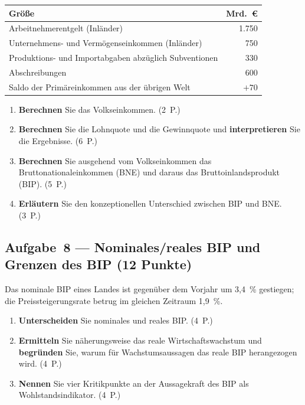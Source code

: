 \documentclass[11pt, a4paper]{article}
\begin{document}
\begin{center}
\begin{tabular}{l r}
\toprule
\textbf{Größe} & \textbf{Mrd.~€}\\
\midrule
Arbeitnehmerentgelt (Inländer) & 1.750\\
Unternehmens- und Vermögenseinkommen (Inländer) & 750\\
Produktions- und Importabgaben abzüglich Subventionen & 330\\
Abschreibungen & 600\\
Saldo der Primäreinkommen aus der übrigen Welt & $+70$\\
\bottomrule
\end{tabular}
\end{center}

\begin{enumerate}[label=(\alph*)]
  \item \textbf{Berechnen} Sie das Volkseinkommen. \hfill (2~P.)
  \item \textbf{Berechnen} Sie die Lohnquote und die Gewinnquote und \textbf{interpretieren} Sie die Ergebnisse. \hfill (6~P.)
  \item \textbf{Berechnen} Sie ausgehend vom Volkseinkommen das Bruttonationaleinkommen (BNE) und daraus das Bruttoinlandsprodukt (BIP). \hfill (5~P.)
  \item \textbf{Erläutern} Sie den konzeptionellen Unterschied zwischen BIP und BNE. \hfill (3~P.)
\end{enumerate}

\subsection*{Aufgabe~8 --- Nominales/reales BIP und Grenzen des BIP (12 Punkte)}

Das nominale BIP eines Landes ist gegenüber dem Vorjahr um 3,4~\% gestiegen; die
Preissteigerungsrate betrug im gleichen Zeitraum 1,9~\%.

\begin{enumerate}[label=(\alph*)]
  \item \textbf{Unterscheiden} Sie nominales und reales BIP. \hfill (4~P.)
  \item \textbf{Ermitteln} Sie näherungsweise das reale Wirtschaftswachstum und \textbf{begründen} Sie, warum für Wachstumsaussagen das reale BIP herangezogen wird. \hfill (4~P.)
  \item \textbf{Nennen} Sie vier Kritikpunkte an der Aussagekraft des BIP als Wohlstandsindikator. \hfill (4~P.)
\end{enumerate}
\end{document}
